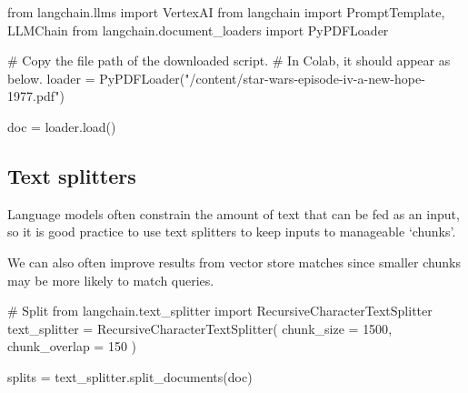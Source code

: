 \documentclass[
  letterpaper,
  DIV=11,
  numbers=noendperiod]{scrreprt}
\newenvironment{Shaded}{\begin{snugshade}}{\end{snugshade}}
\newcommand{\CommentTok}[1]{\textcolor[rgb]{0.37,0.37,0.37}{#1}}
\newcommand{\DecValTok}[1]{\textcolor[rgb]{0.68,0.00,0.00}{#1}}
\newcommand{\ImportTok}[1]{\textcolor[rgb]{0.00,0.46,0.62}{#1}}
\newcommand{\NormalTok}[1]{\textcolor[rgb]{0.00,0.23,0.31}{#1}}
\newcommand{\OperatorTok}[1]{\textcolor[rgb]{0.37,0.37,0.37}{#1}}
\newcommand{\StringTok}[1]{\textcolor[rgb]{0.13,0.47,0.30}{#1}}
\begin{document}
\begin{Shaded}
\begin{Highlighting}[]
\ImportTok{from}\NormalTok{ langchain.llms }\ImportTok{import}\NormalTok{ VertexAI}
\ImportTok{from}\NormalTok{ langchain }\ImportTok{import}\NormalTok{ PromptTemplate, LLMChain}
\ImportTok{from}\NormalTok{ langchain.document\_loaders }\ImportTok{import}\NormalTok{ PyPDFLoader}

\CommentTok{\# Copy the file path of the downloaded script.}
\CommentTok{\# In Colab, it should appear as below.}
\NormalTok{loader }\OperatorTok{=}\NormalTok{ PyPDFLoader(}\StringTok{"/content/star{-}wars{-}episode{-}iv{-}a{-}new{-}hope{-}1977.pdf"}\NormalTok{)}

\NormalTok{doc }\OperatorTok{=}\NormalTok{ loader.load()}
\end{Highlighting}
\end{Shaded}

\hypertarget{text-splitters}{%
\subsection{Text splitters}\label{text-splitters}}

Language models often constrain the amount of text that can be fed as an
input, so it is good practice to use text splitters to keep inputs to
manageable `chunks'.

We can also often improve results from vector store matches since
smaller chunks may be more likely to match queries.

\begin{Shaded}
\begin{Highlighting}[]
\CommentTok{\# Split}
\ImportTok{from}\NormalTok{ langchain.text\_splitter }\ImportTok{import}\NormalTok{ RecursiveCharacterTextSplitter}
\NormalTok{text\_splitter }\OperatorTok{=}\NormalTok{ RecursiveCharacterTextSplitter(}
\NormalTok{    chunk\_size }\OperatorTok{=} \DecValTok{1500}\NormalTok{,}
\NormalTok{    chunk\_overlap }\OperatorTok{=} \DecValTok{150}
\NormalTok{)}
\end{Highlighting}
\end{Shaded}

\begin{Shaded}
\begin{Highlighting}[]
\NormalTok{splits }\OperatorTok{=}\NormalTok{ text\_splitter.split\_documents(doc)}
\end{Highlighting}
\end{Shaded}
\end{document}
